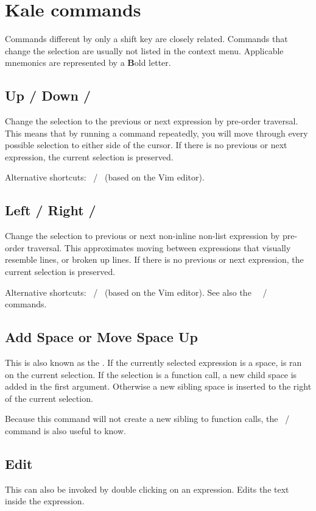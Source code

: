 \chapter{Kale commands}
\newcommand{\shortcut}[3]{\section[#1]{#1 \hfill #2}\label{cmd:#3}}
\newcommand{\pskip}[1]{{\bigskip\par\noindent #1}}

Commands different by only a shift key \keys{\shift} are closely
related. Commands that change the selection are usually not listed in the
context menu. Applicable mnemonics are represented by a \textbf{B}old
letter.

\shortcut{Up / Down}{\ak{^} / }{up_down}
Change the selection to the previous or next expression by pre-order traversal.
This means that by running a command repeatedly, you will move through every
possible selection to either side of the cursor. If there is no previous or
next expression, the current selection is preserved.
\pskip{Alternative shortcuts: ~/~ (based on the Vim editor).}

\shortcut{Left / Right}{\ak{<} / \ak{>}}{left_right}
Change the selection to previous or next non-inline non-list expression by
pre-order traversal. This approximates moving between expressions that visually
resemble lines, or broken up lines. If there is no previous or next expression,
the current selection is preserved.
\pskip{%
Alternative shortcuts: ~/~ (based on the Vim editor).
See also the
\hyperref[cmd:left_right_sibling]{\say{Left / Right Sibling}}%
~{\keys{\shift + H}~/~\keys{\shift + L}}
commands.
}

\shortcut{Add Space or Move Space Up}{\keys{\SPACE}}{smart_space}
This is also known as the . If the currently selected
expression is a space, \hyperref[cmd:move_up]{} is ran on the
current selection. If the selection is a function call, a new child space
is added in the first argument. Otherwise a new sibling space is inserted to
the right of the current selection. 

Because this command will not create a new sibling to function calls, the 
\hyperref[cmd:new_line]{}
~/~ 
command is also useful to know.

\shortcut{Edit}{\keys{\return}}{edit}
This can also be invoked by double clicking on an expression. Edits the text
inside the expression.


